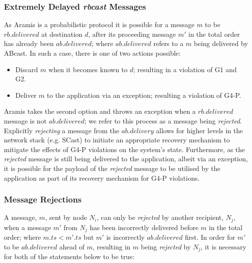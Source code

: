         \subsubsection*{Extremely Delayed \emph{rbcast} Messages}\label{ssec:abcast_rejection}
        As \textsf{Aramis} is a probabilistic protocol it is possible for a message $m$ to be $rb.delivered$ at destination $d$, after its proceeding message $m'$ in the total order has already been $ab.delivered$; where $ab.delivered$ refers to a $m$ being delivered by \textsf{ABcast}. In such a case, there is one of two actions possible:

         \begin{itemize}
            \item    Discard $m$ when it becomes known to $d$; resulting in a violation of G1 and G2.  
            
            \item    Deliver $m$ to the application via an exception; resulting a violation of G4-P.  
        \end{itemize}                       
        
        \textsf{Aramis} takes the second option and throws an exception when a $rb.delivered$ message is not $ab.delivered$; we refer to this process as a message being \emph{rejected}.  Explicitly \emph{rejecting} a message from the $ab.delivery$ allows for higher levels in the network stack (e.g. \textsf{SCast}) to initiate an appropriate recovery mechanism to mitigate the effects of G4-P violations on the system's state.  Furthermore, as the \emph{rejected} message is still being delivered to the application, albeit via an exception, it is possible for the payload of the \emph{rejected} message to be utilised by the application as part of its recovery mechanism for G4-P violations.    
        
        \subsubsection*{Message Rejections}
        A message, $m$, sent by node $N_i$, can only be \emph{rejected} by another recipient, $N_j$, when a message $m'$ from $N_j$ has been incorrectly delivered before $m$ in the total order; where $m.ts < m'.ts$ but $m'$ is incorrectly $ab.delivered$ first.  In order for $m'$ to be $ab.delivered$ ahead of $m$, resulting in $m$ being \emph{rejected} by $N_j$, it is necessary for both of the statements below to be true:
        
